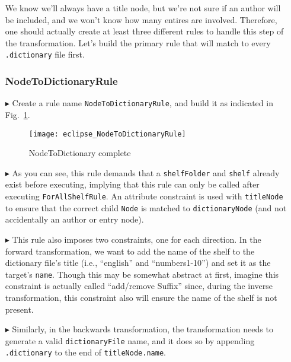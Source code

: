 \begin{itemize}
\newpage

We know we'll always have a title node, but we're not sure if an author will be included, and we won't know how many entires are involved. Therefore, one
should actually create at least three different rules to handle this step of the transformation. Let's build the primary rule that will match to every
\texttt{.dictionary} file first.

\subsubsection{NodeToDictionaryRule} %

\item[$\blacktriangleright$] Create a rule name \texttt{NodeToDictionaryRule}, and build it as indicated in Fig.~\ref{eclipse:NodeToDictionaryRule}.

\begin{figure}[htbp]
\begin{center}
  \texttt{[image: eclipse\_NodeToDictionaryRule]}
  \caption{NodeToDictionary complete}
  \label{eclipse:NodeToDictionaryRule}
\end{center}
\end{figure}

\item[$\blacktriangleright$] As you can see, this rule demands that a \texttt{shelfFolder} and \texttt{shelf} already exist before executing, implying that this
rule can only be called after executing \texttt{ForAllShelfRule}. An attribute constraint is used with \texttt{titleNode} to ensure that the correct child
\texttt{Node} is matched to \texttt{dictionaryNode} (and not accidentally an author or entry node).

\item[$\blacktriangleright$] This rule also imposes two constraints, one for each direction. In the forward transformation, we want to add the name of
the shelf to the dictionary file's title (i.e., ``english'' and ``numbers1-10'') and set it as the target's \texttt{name}. Though this may be somewhat abstract
at first, imagine this constraint is actually called ``add/remove Suffix'' since, during the inverse transformation, this constraint also will ensure the name
of the shelf is not present.

\item[$\blacktriangleright$] Similarly, in the backwards transformation, the transformation needs to generate a valid \texttt{dictionaryFile} name, and it does
so by appending \texttt{.dictionary} to the end of \texttt{titleNode.name}.


\end{itemize}
